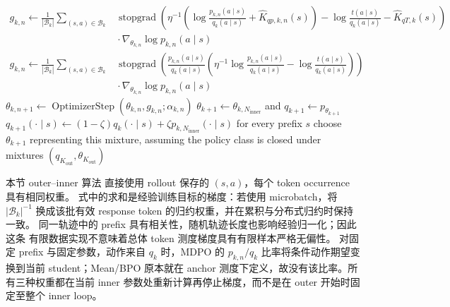 \documentclass[lang=cn,scheme=chinese,openany]{../book/elegantbook}
\newcommand{\sg}{\operatorname{stopgrad}}
\begin{document}
\begin{algorithm}[ht]
\begin{algorithmic}[1]
            \State $\begin{aligned}g_{k,n}\gets\frac1{|\mathcal B_k|}\sum_{(s,a)\in\mathcal B_k}&\sg\!\left(\eta^{-1}\left(\log\frac{p_{k,n}(a\mid s)}{q_k(a\mid s)}+\widehat K_{qp,k,n}(s)\right)-\log\frac{t(a\mid s)}{q_k(a\mid s)}-\widehat K_{qT,k}(s)\right)\\&{}\cdot\nabla_{\theta_{k,n}}\log p_{k,n}(a\mid s)\end{aligned}$
            \State $\begin{aligned}g_{k,n}\gets\frac1{|\mathcal B_k|}\sum_{(s,a)\in\mathcal B_k}&\sg\!\left(\frac{p_{k,n}(a\mid s)}{q_k(a\mid s)}\left(\eta^{-1}\log\frac{p_{k,n}(a\mid s)}{q_k(a\mid s)}-\log\frac{t(a\mid s)}{q_k(a\mid s)}\right)\right)\\&{}\cdot\nabla_{\theta_{k,n}}\log p_{k,n}(a\mid s)\end{aligned}$
        \EndIf
        \State $\theta_{k,n+1}\gets\operatorname{OptimizerStep}(\theta_{k,n},g_{k,n};\alpha_{k,n})$ 
    \EndFor
        \State $\theta_{k+1}\gets\theta_{k,N_{\mathrm{inner}}}$ and $q_{k+1}\gets p_{\theta_{k+1}}$
    \Else
        \State $q_{k+1}(\cdot\mid s)\gets(1-\zeta)q_k(\cdot\mid s)+\zeta p_{k,N_{\mathrm{inner}}}(\cdot\mid s)$ for every prefix $s$
        \State choose $\theta_{k+1}$ representing this mixture, assuming the policy class is closed under mixtures 
    \EndIf
\EndFor
\State \Return $(q_{K_{\mathrm{out}}},\theta_{K_{\mathrm{out}}})$
\end{algorithmic}
\end{algorithm}

本节 outer--inner 算法 直接使用 rollout 保存的 $(s,a)$，每个 token occurrence 具有相同权重。 式中的求和是经验训练目标的梯度：若使用 microbatch，将 $|\mathcal B_k|^{-1}$ 换成该批有效 response token 的归约权重，并在累积与分布式归约时保持一致。 同一轨迹中的 prefix 具有相关性，随机轨迹长度也影响经验归一化；因此这条 有限数据实现不意味着总体 token 测度梯度具有有限样本严格无偏性。 对固定 prefix 与固定参数，动作来自 $q_k$ 时，MDPO 的 $p_{k,n}/q_k$ 比率将条件动作期望变换到当前 student；Mean/BPO 原本就在 anchor 测度下定义，故没有该比率。所有三种权重都在当前 inner 参数处重新计算再停止梯度，而不是在 outer 开始时固定至整个 inner loop。
\end{document}
